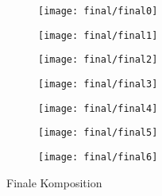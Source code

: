 \begin{figure}[htbp]
	\centering

		    	
	\begin{subfigure}[b]{0.19\textwidth}
		\centering
		\texttt{[image: final/final0]} %
		\caption{}
	\end{subfigure}
	\begin{subfigure}[b]{0.19\textwidth}
		\centering
		\texttt{[image: final/final1]} %
		\caption{}
	\end{subfigure}
	\begin{subfigure}[b]{0.19\textwidth}
		\centering
		\texttt{[image: final/final2]} %
		\caption{}
	\end{subfigure}
	\begin{subfigure}[b]{0.19\textwidth}
		\centering
		\texttt{[image: final/final3]} %
		\caption{}
	\end{subfigure}
	\begin{subfigure}[b]{0.19\textwidth}
		\centering
		\texttt{[image: final/final4]} %
		\caption{}
	\end{subfigure}
	\begin{subfigure}[b]{0.19\textwidth}
		\centering
		\texttt{[image: final/final5]} %
		\caption{}
	\end{subfigure}
	\begin{subfigure}[b]{0.19\textwidth}
		\centering
		\texttt{[image: final/final6]} %
		\caption{}
	\end{subfigure}
			    
	\caption{Finale Komposition}
	\label{fig:final}
\end{figure}


